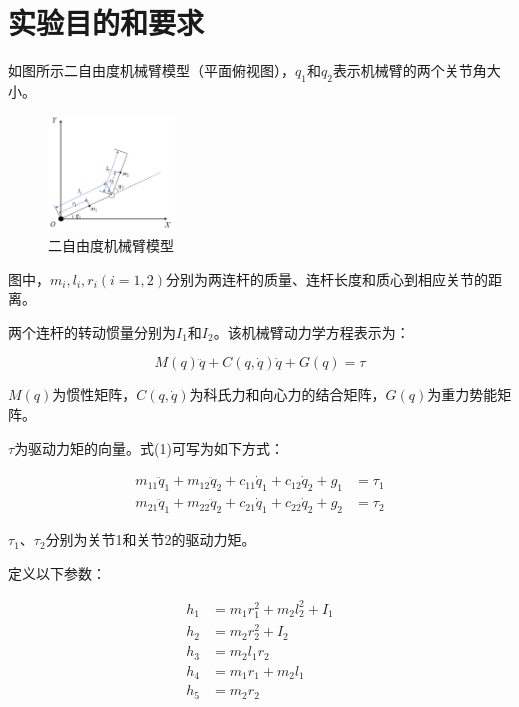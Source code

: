 \documentclass[12pt,a4paper,UTF8]{article}
\begin{document}

\maketoc    %
\section{实验目的和要求}

如图所示二自由度机械臂模型（平面俯视图），$q_1$和$q_2$表示机械臂的两个关节角大小。

\begin{figure}[htbp]
    \centering
    \includegraphics[width=0.3\textwidth]{figures/20241206103243.png}
    \caption{二自由度机械臂模型}
    \label{fig:robot-arm}
\end{figure}

图中，$m_i, l_i, r_i (i=1,2)$分别为两连杆的质量、连杆长度和质心到相应关节的距离。

两个连杆的转动惯量分别为$I_1$和$I_2$。该机械臂动力学方程表示为：

\begin{equation}
M(q)\ddot{q} + C(q, \dot{q})\dot{q} + G(q) = \tau 
\end{equation}

$M(q)$为惯性矩阵，$C(q, \dot{q})$为科氏力和向心力的结合矩阵，$G(q)$为重力势能矩阵。

$\tau$为驱动力矩的向量。式(1)可写为如下方式：

\begin{equation}
\begin{aligned}
m_{11}\ddot{q}_1 + m_{12}\ddot{q}_2 + c_{11}\dot{q}_1 + c_{12}\dot{q}_2 + g_1 &= \tau_1 \\
m_{21}\ddot{q}_1 + m_{22}\ddot{q}_2 + c_{21}\dot{q}_1 + c_{22}\dot{q}_2 + g_2 &= \tau_2
\end{aligned}
\end{equation}

$\tau_1$、$\tau_2$分别为关节1和关节2的驱动力矩。

定义以下参数：

\begin{equation}
\begin{aligned}
h_1 &= m_1r_1^2 + m_2l_2^2 + I_1 \\
h_2 &= m_2r_2^2 + I_2 \\
h_3 &= m_2l_1r_2 \\
h_4 &= m_1r_1 + m_2l_1 \\
h_5 &= m_2r_2
\end{aligned}
\end{equation}
\end{document}
